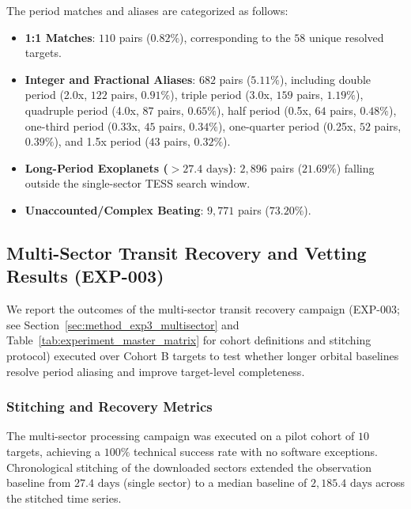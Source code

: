 The period matches and aliases are categorized as follows:
\begin{itemize}
    \item \textbf{1:1 Matches}: $110$ pairs ($0.82\%$), corresponding to the $58$ unique resolved targets.
    \item \textbf{Integer and Fractional Aliases}: $682$ pairs ($5.11\%$), including double period (2.0x, $122$ pairs, $0.91\%$), triple period (3.0x, $159$ pairs, $1.19\%$), quadruple period (4.0x, $87$ pairs, $0.65\%$), half period (0.5x, $64$ pairs, $0.48\%$), one-third period (0.33x, $45$ pairs, $0.34\%$), one-quarter period (0.25x, $52$ pairs, $0.39\%$), and 1.5x period ($43$ pairs, $0.32\%$).
    \item \textbf{Long-Period Exoplanets ($> 27.4\text{ days}$)}: $2,896$ pairs ($21.69\%$) falling outside the single-sector TESS search window.
    \item \textbf{Unaccounted/Complex Beating}: $9,771$ pairs ($73.20\%$).
\end{itemize}

\subsection{Multi-Sector Transit Recovery and Vetting Results (EXP-003)} \label{sec:results_exp3_multisector}
We report the outcomes of the multi-sector transit recovery campaign (EXP-003; see Section~\ref{sec:method_exp3_multisector} and Table~\ref{tab:experiment_master_matrix} for cohort definitions and stitching protocol) executed over Cohort B targets to test whether longer orbital baselines resolve period aliasing and improve target-level completeness.

\subsubsection{Stitching and Recovery Metrics}
The multi-sector processing campaign was executed on a pilot cohort of $10$ targets, achieving a $100\%$ technical success rate with no software exceptions. Chronological stitching of the downloaded sectors extended the observation baseline from $27.4\text{ days}$ (single sector) to a median baseline of $2,185.4\text{ days}$ across the stitched time series.

